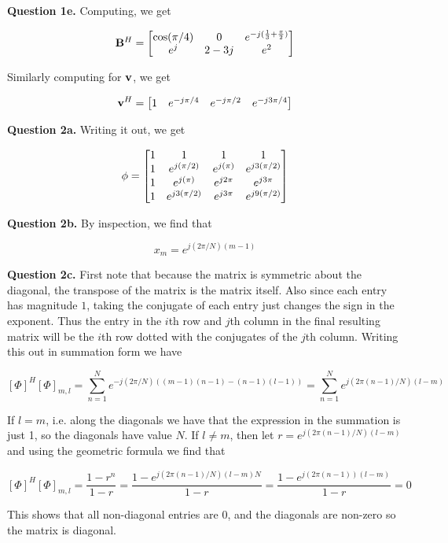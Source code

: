 \documentclass[letterpaper, reqno,11pt]{article}
\begin{document}
{\noindent\bf Question 1e.} Computing, we get 

$$
    {\bf B}^H=\begin{bmatrix}
        \cos(\pi/4)&0&e^{-j(\frac13+\frac\pi2)}\\
        e^j&2-3j&e^2
    \end{bmatrix}
$$

Similarly computing for $\bf v$, we get 

$$
    {\bf v}^H=
    \begin{bmatrix}
        1&
        e^{-j\pi/4}&
        e^{-j\pi/2}&
        e^{-j3\pi/4}
    \end{bmatrix}
$$

{\noindent\bf Question 2a.} Writing it out, we get 

$$
    {\bf \phi}=
    \begin{bmatrix}
        1&1&1&1\\
        1&e^{j(\pi/2)}&e^{j(\pi)}&e^{j3(\pi/2)}\\
        1&e^{j(\pi)}&e^{j2\pi}&e^{j3\pi}\\
        1&e^{j3(\pi/2)}&e^{j3\pi}&e^{j9(\pi/2)}
    \end{bmatrix}
$$

{\noindent\bf Question 2b.} By inspection, we find that 

$$
    x_m=e^{j(2\pi/N)(m-1)}
$$

{\noindent\bf Question 2c.} First note that because the matrix is symmetric about the diagonal, the transpose of the matrix is the matrix itself. Also since each entry has magnitude $1$, taking the conjugate of each entry just changes the sign in the exponent. Thus the entry in the $i$th row and $j$th column in the final resulting matrix will be the $i$th row dotted with the conjugates of the $j$th column. Writing this out in summation form we have 

$$
    [\Phi]^H[\Phi]_{m,l}=\sum_{n=1}^{N}e^{-j(2\pi/N)((m-1)(n-1)-(n-1)(l-1))}=\sum_{n=1}^{N}e^{j(2\pi(n-1)/N)(l-m)}
$$

If $l=m$, i.e. along the diagonals we have that the expression in the summation is just 1, so the diagonals have value $N$. If $l\neq m$, then let $r=e^{j(2\pi(n-1)/N)(l-m)}$ and using the geometric formula we find that 

$$
    [\Phi]^H[\Phi]_{m,l}=\frac{1-r^n}{1-r}=\frac{1-e^{j(2\pi(n-1)/N)(l-m)N}}{1-r}=\frac{1-e^{j(2\pi(n-1))(l-m)}}{1-r}=0
$$

This shows that all non-diagonal entries are 0, and the diagonals are non-zero so the matrix is diagonal. 
\end{document}
